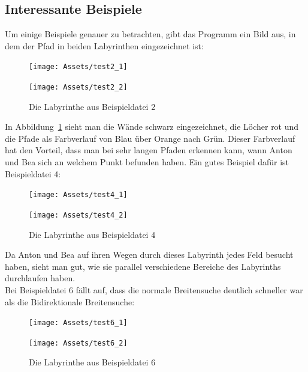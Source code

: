 \documentclass[a4paper,10pt,ngerman]{scrartcl}
\begin{document}
    \subsection{Interessante Beispiele}
    Um einige Beispiele genauer zu betrachten, gibt das Programm ein Bild aus, in dem der Pfad in beiden Labyrinthen eingezeichnet ist:
    \begin{figure} [H]
        \label{fig:2}
        \centering
        \begin{minipage}{.5\textwidth}
            \centering
            \texttt{[image: Assets/test2\_1]}
        \end{minipage}%
        \begin{minipage}{.5\textwidth}
            \centering
            \texttt{[image: Assets/test2\_2]}
        \end{minipage}
        \caption{Die Labyrinthe aus Beispieldatei 2}
    \end{figure}
    In Abbildung~\ref{fig:2} sieht man die Wände schwarz eingezeichnet, die Löcher rot und die Pfade als Farbverlauf von Blau über Orange nach Grün.
    Dieser Farbverlauf hat den Vorteil, dass man bei sehr langen Pfaden erkennen kann, wann Anton und Bea sich an welchem Punkt befunden haben.
    Ein gutes Beispiel dafür ist Beispieldatei 4:
    \begin{figure} [H]
        \label{fig:4}
        \centering
        \begin{minipage}{.5\textwidth}
            \centering
            \texttt{[image: Assets/test4\_1]}
        \end{minipage}%
        \begin{minipage}{.5\textwidth}
            \centering
            \texttt{[image: Assets/test4\_2]}
        \end{minipage}
        \caption{Die Labyrinthe aus Beispieldatei 4}
    \end{figure}
    Da Anton und Bea auf ihren Wegen durch dieses Labyrinth jedes Feld besucht haben, sieht man gut, wie sie parallel verschiedene Bereiche des Labyrinths durchlaufen haben. \\
    Bei Beispieldatei 6 fällt auf, dass die normale Breitensuche deutlich schneller war als die Bidirektionale Breitensuche:
    \begin{figure} [H]
        \label{fig:6}
        \centering
        \begin{minipage}{.5\textwidth}
            \centering
            \texttt{[image: Assets/test6\_1]}
        \end{minipage}%
        \begin{minipage}{.5\textwidth}
            \centering
            \texttt{[image: Assets/test6\_2]}
        \end{minipage}
        \caption{Die Labyrinthe aus Beispieldatei 6}
    \end{figure}
\end{document}
